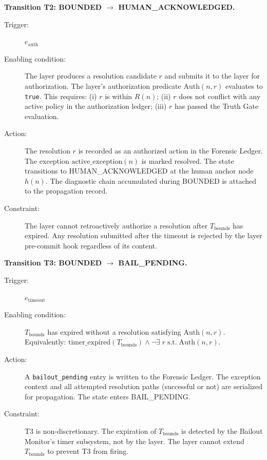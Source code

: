 \bigskip
\noindent\textbf{Transition T2: BOUNDED $\rightarrow$ HUMAN\_ACKNOWLEDGED.}

\begin{description}
\item[Trigger:] $e_{\text{auth}}$
\item[Enabling condition:] The \bounds{} layer produces a resolution candidate $r$ and submits it to the \fact{} layer for authorization. The \fact{} layer's authorization predicate $\text{Auth}(n, r)$ evaluates to \texttt{true}. This requires: (i) $r$ is within $R(n)$; (ii) $r$ does not conflict with any active policy in the authorization ledger; (iii) $r$ has passed the Truth Gate evaluation.
\item[Action:] The resolution $r$ is recorded as an authorized action in the Forensic Ledger. The exception $\text{active\_exception}(n)$ is marked resolved. The state transitions to HUMAN\_ACKNOWLEDGED at the human anchor node $h(n)$. The diagnostic chain accumulated during BOUNDED is attached to the propagation record.
\item[Constraint:] The \bounds{} layer cannot retroactively authorize a resolution after $T_{\text{bounds}}$ has expired. Any resolution submitted after the timeout is rejected by the \fact{} layer pre-commit hook regardless of its content.
\end{description}

\bigskip
\noindent\textbf{Transition T3: BOUNDED $\rightarrow$ BAIL\_PENDING.}

\begin{description}
\item[Trigger:] $e_{\text{timeout}}$
\item[Enabling condition:] $T_{\text{bounds}}$ has expired without a resolution satisfying $\text{Auth}(n, r)$. Equivalently: $\text{timer\_expired}(T_{\text{bounds}}) \land \neg\exists\; r\; \text{s.t.} \; \text{Auth}(n, r)$.
\item[Action:] A \texttt{bailout\_pending} entry is written to the Forensic Ledger. The exception context and all attempted resolution paths (successful or not) are serialized for propagation. The state enters BAIL\_PENDING.
\item[Constraint:] T3 is non-discretionary. The expiration of $T_{\text{bounds}}$ is detected by the Bailout Monitor's timer subsystem, not by the \bounds{} layer. The \bounds{} layer cannot extend $T_{\text{bounds}}$ to prevent T3 from firing.
\end{description}

